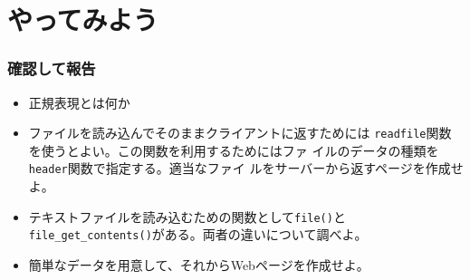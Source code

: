  \section{やってみよう}
\begin{frame}[containsverbatim]
 \frametitle{確認して報告}
 \begin{itemize}
  \item 正規表現とは何か
  \item ファイルを読み込んでそのままクライアントに返すためには
        \texttt{readfile}関数を使うとよい。この関数を利用するためにはファ
        イルのデータの種類を\texttt{header}関数で指定する。適当なファイ
        ルをサーバーから返すページを作成せよ。
  \item テキストファイルを読み込むための関数として\Verb+file()+と
        \Verb+file_get_contents()+がある。両者の違いについて調べよ。
  \item 簡単なデータを用意して、それからWebページを作成せよ。
 \end{itemize}
\end{frame}

\begin{frame}[containsverbatim]
\frametitle{}
\end{frame}

